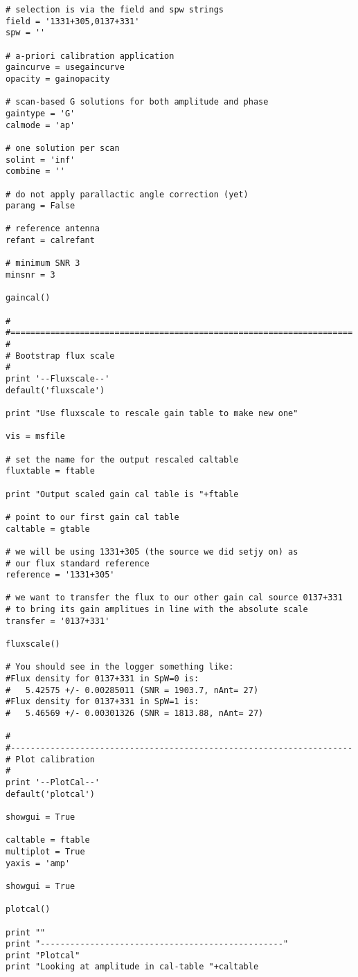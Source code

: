 \begin{verbatim}
# selection is via the field and spw strings
field = '1331+305,0137+331'
spw = ''

# a-priori calibration application
gaincurve = usegaincurve
opacity = gainopacity

# scan-based G solutions for both amplitude and phase
gaintype = 'G'
calmode = 'ap'

# one solution per scan
solint = 'inf'
combine = ''

# do not apply parallactic angle correction (yet)
parang = False

# reference antenna
refant = calrefant

# minimum SNR 3
minsnr = 3

gaincal()

#
#=====================================================================
#
# Bootstrap flux scale
#
print '--Fluxscale--'
default('fluxscale')

print "Use fluxscale to rescale gain table to make new one"

vis = msfile

# set the name for the output rescaled caltable
fluxtable = ftable

print "Output scaled gain cal table is "+ftable

# point to our first gain cal table
caltable = gtable

# we will be using 1331+305 (the source we did setjy on) as
# our flux standard reference
reference = '1331+305'

# we want to transfer the flux to our other gain cal source 0137+331
# to bring its gain amplitues in line with the absolute scale
transfer = '0137+331'

fluxscale()

# You should see in the logger something like:
#Flux density for 0137+331 in SpW=0 is:
#   5.42575 +/- 0.00285011 (SNR = 1903.7, nAnt= 27)
#Flux density for 0137+331 in SpW=1 is:
#   5.46569 +/- 0.00301326 (SNR = 1813.88, nAnt= 27)

#
#---------------------------------------------------------------------
# Plot calibration
#
print '--PlotCal--'
default('plotcal')

showgui = True
    
caltable = ftable
multiplot = True
yaxis = 'amp'

showgui = True
    
plotcal()

print ""
print "-------------------------------------------------"
print "Plotcal"
print "Looking at amplitude in cal-table "+caltable


\end{verbatim}
